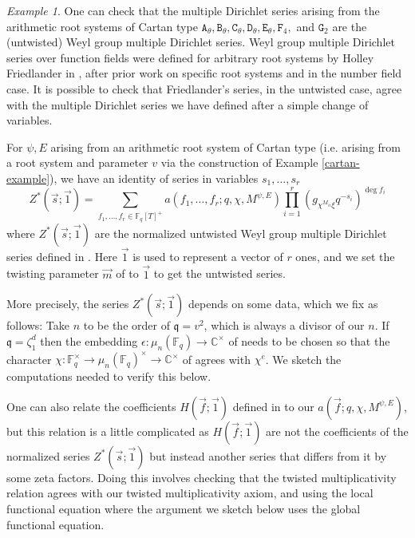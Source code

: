 \documentclass[11pt,letterpaper]{article}
\theoremstyle{definition}
\theoremstyle{remark}
\newtheorem{example}[theorem]{Example}
\numberwithin{equation}{section}
\theoremstyle{dotless}
\newcommand{\hchi}{\psi} %
\newcommand{\gene}{\zeta_1} %
\begin{document}
 \begin{example}\label{wgmds} One can check that the multiple Dirichlet series arising from the arithmetic root systems of Cartan type $\mathtt A_\theta, \mathtt B_\theta, \mathtt C_\theta, \mathtt D_\theta, \mathtt E_\theta, \mathtt F_4,$ and $ \mathtt G_2$ are the (untwisted) Weyl group multiple Dirichlet series. Weyl group multiple Dirichlet series over function fields were defined for arbitrary root systems by Holley Friedlander in \cite{HFriedlander23}, after prior work on specific root systems and in the number field case. It is possible to check that Friedlander's series, in the untwisted case, agree with the multiple Dirichlet series we have defined after a simple change of variables. 

For $\hchi, E$ arising from an arithmetic root system of Cartan type (i.e. arising from a root system and parameter $v$ via the construction of Example \ref{cartan-example}), we have an identity of series in variables $s_1,\dots,s_r$
\begin{equation}\label{comparison-to-friedlander} Z^* (\vec{s}; \vec{1} ) = \sum_{f_1,\dots, f_r \in \mathbb F_q[T]^+ } a( f_1,\dots, f_r; q, \chi, M^{\hchi, E})  \prod_{i=1}^r ( g_{ \chi^{M_{ii}} \xi} q^{-s_i})^{ \deg f_i} \end{equation}
where $Z^*(\vec{s}; \vec{1} )$ are the normalized untwisted Weyl group multiple Dirichlet series defined in \cite[p. 347] {HFriedlander23}. Here $\vec{1}$ is used to represent a vector of $r$ ones, and we set the twisting parameter $\vec{m}$ of \cite{HFriedlander23}  to $\vec{1}$ to get the untwisted series. 

More precisely, the series $Z^*(\vec{s}; \vec{1})$ depends on some data, which we fix as follows: Take $n$ to be the order of $\mathfrak q=v^2$, which is always a divisor of our $n$.  If $\mathfrak q = \gene^d$ then the embedding $\epsilon\colon \mu_n(\mathbb F_q)\to \mathbb C^\times$ of \cite[\S2]{HFriedlander23} needs to be chosen so that the character $\chi: \mathbb F_q^\times \to \mu_n(\mathbb F_q)^\times \to \mathbb C^\times$ of \cite[\S2]{HFriedlander23} agrees with $\chi^e$. We sketch the computations needed to verify this below.

One can also relate the coefficients $H(\vec{f};\vec{1} )$ defined in \cite{HFriedlander23} to our $ a( \vec{f} ; q, \chi, M^{\hchi, E})$, but this relation is a little complicated as $H(\vec{f} ;\vec{1})$ are not the coefficients of the normalized series $Z^* (\vec{s}; \vec{1})$ but instead another series that differs from it by some zeta factors.  Doing this involves checking that the twisted multiplicativity relation \cite[(16)]{HFriedlander23} agrees with our twisted multiplicativity axiom, and using the local functional equation \cite[(15)]{HFriedlander23} where the argument we sketch below uses the global functional equation.


\end{example}
\end{document}
